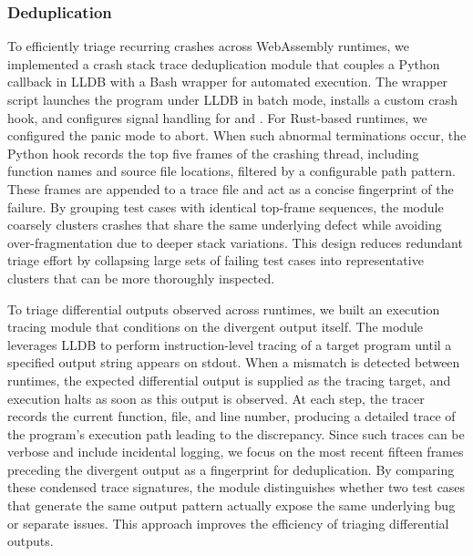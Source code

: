 \documentclass[lettersize,journal]{IEEEtran}
\begin{document}
\subsubsection{Deduplication} To efficiently triage recurring crashes across WebAssembly runtimes, we implemented a crash stack trace deduplication module that couples a Python callback in LLDB \cite{lldb} with a Bash wrapper for automated execution. The wrapper script launches the program under LLDB in batch mode, installs a custom crash hook, and configures signal handling for  and . For Rust-based runtimes, we configured the panic mode to abort. When such abnormal terminations occur, the Python hook records the top five frames of the crashing thread, including function names and source file locations, filtered by a configurable path pattern. These frames are appended to a trace file and act as a concise fingerprint of the failure. By grouping test cases with identical top-frame sequences, the module coarsely clusters crashes that share the same underlying defect while avoiding over-fragmentation due to deeper stack variations. This design reduces redundant triage effort by collapsing large sets of failing test cases into representative clusters that can be more thoroughly inspected.

To triage differential outputs observed across runtimes, we built an execution tracing module that conditions on the divergent output itself. The module leverages LLDB to perform instruction-level tracing of a target program until a specified output string appears on stdout. When a mismatch is detected between runtimes, the expected differential output is supplied as the tracing target, and execution halts as soon as this output is observed. At each step, the tracer records the current function, file, and line number, producing a detailed trace of the program’s execution path leading to the discrepancy. Since such traces can be verbose and include incidental logging, we focus on the most recent fifteen frames preceding the divergent output as a fingerprint for deduplication. By comparing these condensed trace signatures, the module distinguishes whether two test cases that generate the same output pattern actually expose the same underlying bug or separate issues. This approach improves the efficiency of triaging differential outputs.
\end{document}
